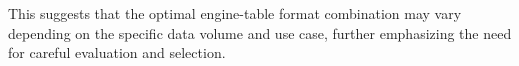This suggests that the optimal engine-table format combination may vary depending on the specific data volume and use case, further emphasizing the need for careful evaluation and selection.
\cite{OngoingEvolutionTableFormat} %
\cite{StateDataLakehouse2025}      %
